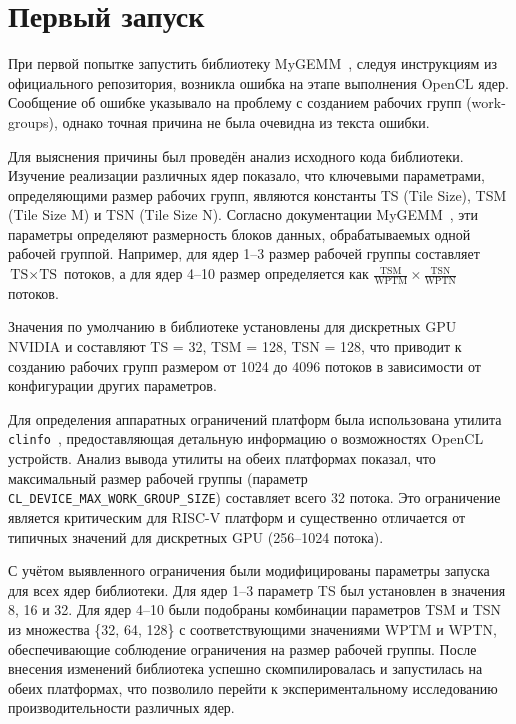 
\section{Первый запуск}

При первой попытке запустить библиотеку MyGEMM~\cite{mygemm_repo}, следуя инструкциям из официального репозитория, возникла ошибка на этапе выполнения OpenCL ядер. Сообщение об ошибке указывало на проблему с созданием рабочих групп (work-groups), однако точная причина не была очевидна из текста ошибки.

Для выяснения причины был проведён анализ исходного кода библиотеки. Изучение реализации различных ядер показало, что ключевыми параметрами, определяющими размер рабочих групп, являются константы TS (Tile Size), TSM (Tile Size M) и TSN (Tile Size N). Согласно документации MyGEMM~\cite{nugteren2018mygemm}, эти параметры определяют размерность блоков данных, обрабатываемых одной рабочей группой. Например, для ядер 1--3 размер рабочей группы составляет $\text{TS} \times \text{TS}$ потоков, а для ядер 4--10 размер определяется как $\frac{\text{TSM}}{\text{WPTM}} \times \frac{\text{TSN}}{\text{WPTN}}$ потоков.

Значения по умолчанию в библиотеке установлены для дискретных GPU NVIDIA и составляют TS = 32, TSM = 128, TSN = 128, что приводит к созданию рабочих групп размером от 1024 до 4096 потоков в зависимости от конфигурации других параметров.

Для определения аппаратных ограничений платформ была использована утилита \texttt{clinfo}~\cite{clinfo}, предоставляющая детальную информацию о возможностях OpenCL устройств. Анализ вывода утилиты на обеих платформах показал, что максимальный размер рабочей группы (параметр \texttt{CL\_DEVICE\_MAX\_WORK\_GROUP\_SIZE}) составляет всего 32 потока. Это ограничение является критическим для RISC-V платформ и существенно отличается от типичных значений для дискретных GPU (256--1024 потока).

С учётом выявленного ограничения были модифицированы параметры запуска для всех ядер библиотеки. Для ядер 1--3 параметр TS был установлен в значения 8, 16 и 32. Для ядер 4--10 были подобраны комбинации параметров TSM и TSN из множества \{32, 64, 128\} с соответствующими значениями WPTM и WPTN, обеспечивающие соблюдение ограничения на размер рабочей группы. После внесения изменений библиотека успешно скомпилировалась и запустилась на обеих платформах, что позволило перейти к экспериментальному исследованию производительности различных ядер.